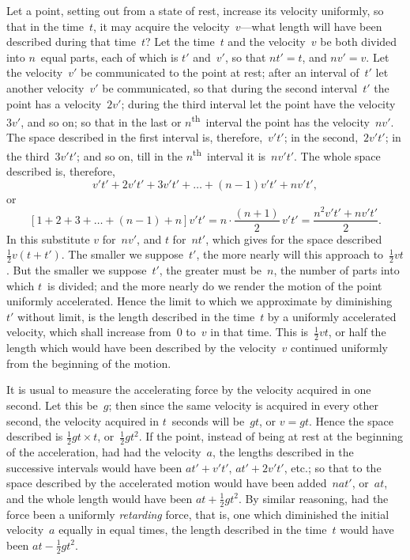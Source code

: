 \documentclass[12pt]{book}[2005/09/16]
\newcommand{\Chg}[2]{#2}
\newcommand{\Add}[1]{\Chg{}{#1}}
\newcommand{\Pagelabel}[1]{\phantomsection\label{page:#1}}
\newcommand{\PageSep}[1]{\Pagelabel{#1}\ignorespaces}
\renewcommand{\th}{\textsuperscript{th}}
\renewcommand{\(}{{\upshape(}}
\renewcommand{\)}{{\upshape)}}
\begin{document}
Let a point, setting out from a state of rest, increase
its velocity uniformly, so that in the time~$t$, it
may acquire the velocity~$v$---what length will have
been described during that time~$t$? Let the time~$t$
and the velocity~$v$ be both divided into $n$~equal parts,
each of which is $t'$ and~$v'$, so that $nt' = t$, and $nv' = v$.
Let the velocity~$v'$ be communicated to the point at
rest; after an interval of~$t'$ let another velocity~$v'$ be
\PageSep{62}
communicated, so that during the second interval~$t'$
the point has a velocity~$2v'$; during the third interval
let the point have the velocity~$3v'$, and so on; so that
in the last or $n$\th~interval the point has the velocity~$nv'$.
The space described in the first interval is, therefore,~$v't'$;
in the second,~$2v't'$; in the third~$3v't'$; and
so on, till in the $n$\th~interval it is~$nv't'$. The whole
space described is, therefore,
\[
v't' + 2v't' + 3v't' + \dots + (n - 1)v't' + nv't'\Add{,}
\]
or
\[
[1 + 2 + 3 \Add{+} \dots + (n - 1) + n]v't'
  = n · \frac{(n + 1)}{2}\, v't'
  = \frac{n^{2} v't' + nv't'}{2}.
\]
In this substitute $v$ for~$nv'$, and $t$ for~$nt'$, which gives
for the space described $\frac{1}{2}v(t + t')$. The smaller we
suppose~$t'$, the more nearly will this approach to~$\frac{1}{2}vt$.
But the smaller we suppose~$t'$, the greater must be~$n$,
the number of parts into which $t$~is divided; and the
more nearly do we render the motion of the point uniformly
accelerated. Hence the limit to which we approximate
by diminishing~$t'$ without limit, is the length
described in the time~$t$ by a uniformly accelerated
velocity, which shall increase from~$0$ to~$v$ in that time.
This is~$\frac{1}{2}vt$, or half the length which would have been
described by the velocity~$v$ continued uniformly from
the beginning of the motion.

It is usual to measure the accelerating force by the
%
velocity acquired in one second. Let this be~$g$; then
since the same velocity is acquired in every other second,
the velocity acquired in $t$~seconds will be~$gt$, or
$v = gt$. Hence the space described is $\frac{1}{2}gt × t$, or~$\frac{1}{2}gt^{2}$.
If the point, instead of being at rest at the beginning
of the acceleration, had had the velocity~$a$, the lengths
\PageSep{63}
described in the successive intervals would have been
$at' + v't'$, $at' + 2v't'$, etc.; so that to the space described
by the accelerated motion would have been added~$nat'$,
or~$at$, and the whole length would have been
$at + \frac{1}{2}gt^{2}$. By similar reasoning, had the force been
a uniformly \emph{retarding} force, that is, one which diminished
%
the initial velocity~$a$ equally in equal times, the
length described in the time~$t$ would have been $at - \frac{1}{2}gt^{2}$.
\end{document}
